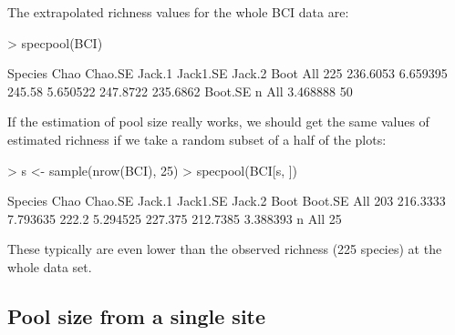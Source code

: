 \documentclass[a4paper,10pt]{amsart}
\begin{document}
The extrapolated richness values for the whole BCI data are:
\begin{Schunk}
\begin{Sinput}
> specpool(BCI)
\end{Sinput}
\begin{Soutput}
    Species     Chao  Chao.SE Jack.1 Jack1.SE   Jack.2     Boot
All     225 236.6053 6.659395 245.58 5.650522 247.8722 235.6862
     Boot.SE  n
All 3.468888 50
\end{Soutput}
\end{Schunk}
If the estimation of pool size really works, we should get the same
values of estimated richness if we take a random subset of a half of
the plots:
\begin{Schunk}
\begin{Sinput}
> s <- sample(nrow(BCI), 25)
> specpool(BCI[s, ])
\end{Sinput}
\begin{Soutput}
    Species     Chao  Chao.SE Jack.1 Jack1.SE  Jack.2     Boot  Boot.SE
All     203 216.3333 7.793635  222.2 5.294525 227.375 212.7385 3.388393
     n
All 25
\end{Soutput}
\end{Schunk}
These typically are even lower than the observed richness
(225 species) at the whole data set.

\subsection{Pool size from a single site}
\end{document}
